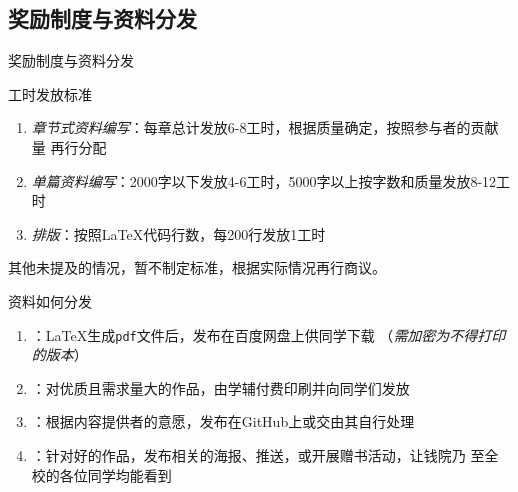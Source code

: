 \documentclass[10pt]{beamer}
\begin{document}
\subsection{奖励制度与资料分发}
\begin{frame}{奖励制度与资料分发}
\begin{exampleblock}{工时发放标准}\footnotesize
\begin{enumerate}
    \item \textit{章节式资料编写}：每章总计发放6-8工时，根据质量确定，按照参与者的贡献量
    再行分配
    \item \textit{单篇资料编写}：2000字以下发放4-6工时，5000字以上按字数和质量发放8-12工时
    \item \textit{排版}：按照\LaTeX{}代码行数，每200行发放1工时
\end{enumerate}

其他未提及的情况，暂不制定标准，根据实际情况再行商议。
\end{exampleblock}

\begin{alertblock}{资料如何分发}\footnotesize
\begin{enumerate}
    \item {}：\LaTeX{}生成\texttt{pdf}文件后，发布在百度网盘上供同学下载
    （\textit{需加密为不得打印的版本}）
    \item {}：对优质且需求量大的作品，由学辅付费印刷并向同学们发放
    \item {}：根据内容提供者的意愿，发布在GitHub上或交由其自行处理
    \item {}：针对好的作品，发布相关的海报、推送，或开展赠书活动，让钱院乃
    至全校的各位同学均能看到
\end{enumerate}
\end{alertblock}
\end{frame}
\end{document}
